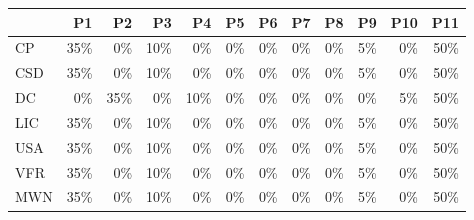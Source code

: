 \begin{figure*}
	\centering
	\scriptsize
\begin{tabular}{lrrrrrrrrrrr}
\toprule
      & P1    & P2    & P3    & P4    & P5    & P6    & P7    & P8    & P9    & P10   & P11 \\
\midrule
CP    & \cellcolor{lightgreen}35\%   & \cellcolor{lightred}0\%   & \cellcolor{lightgreen}10\%   & \cellcolor{lightred}0\%   & \cellcolor{lightred}0\%   & \cellcolor{lightred}0\%   & \cellcolor{lightred}0\%   & \cellcolor{lightred}0\%   & \cellcolor{lightblack}5\%   & \cellcolor{lightred}0\%   & \cellcolor{lightgreen}50\% \\
CSD   & \cellcolor{lightgreen}35\%   & \cellcolor{lightred}0\%   & \cellcolor{lightgreen}10\%   & \cellcolor{lightred}0\%   & \cellcolor{lightred}0\%   & \cellcolor{lightred}0\%   & \cellcolor{lightred}0\%   & \cellcolor{lightred}0\%   & \cellcolor{lightblack}5\%   & \cellcolor{lightred}0\%   & \cellcolor{lightgreen}50\% \\
DC    & \cellcolor{lightred}0\%   & \cellcolor{lightgreen}35\%   & \cellcolor{lightred}0\%   & \cellcolor{lightgreen}10\%   & \cellcolor{lightred}0\%   & \cellcolor{lightred}0\%   & \cellcolor{lightred}0\%   & \cellcolor{lightred}0\%   & \cellcolor{lightred}0\%   & \cellcolor{lightblack}5\%   & \cellcolor{lightgreen}50\% \\
LIC   & \cellcolor{lightgreen}35\%   & \cellcolor{lightred}0\%   & \cellcolor{lightgreen}10\%   & \cellcolor{lightred}0\%   & \cellcolor{lightred}0\%   & \cellcolor{lightred}0\%   & \cellcolor{lightred}0\%   & \cellcolor{lightred}0\%   & \cellcolor{lightblack}5\%   & \cellcolor{lightred}0\%   & \cellcolor{lightgreen}50\% \\
USA   & \cellcolor{lightgreen}35\%   & \cellcolor{lightred}0\%   & \cellcolor{lightgreen}10\%   & \cellcolor{lightred}0\%   & \cellcolor{lightred}0\%   & \cellcolor{lightred}0\%   & \cellcolor{lightred}0\%   & \cellcolor{lightred}0\%   & \cellcolor{lightblack}5\%   & \cellcolor{lightred}0\%   & \cellcolor{lightgreen}50\% \\
VFR   & \cellcolor{lightgreen}35\%   & \cellcolor{lightred}0\%   & \cellcolor{lightgreen}10\%   & \cellcolor{lightred}0\%   & \cellcolor{lightred}0\%   & \cellcolor{lightred}0\%   & \cellcolor{lightred}0\%   & \cellcolor{lightred}0\%   & \cellcolor{lightblack}5\%   & \cellcolor{lightred}0\%   & \cellcolor{lightgreen}50\% \\
MWN   & \cellcolor{lightgreen}35\%   & \cellcolor{lightred}0\%   & \cellcolor{lightgreen}10\%   & \cellcolor{lightred}0\%   & \cellcolor{lightred}0\%   & \cellcolor{lightred}0\%   & \cellcolor{lightred}0\%   & \cellcolor{lightred}0\%   & \cellcolor{lightblack}5\%   & \cellcolor{lightred}0\%   & \cellcolor{lightgreen}50\% \\

\end{tabular}
\end{figure*}
